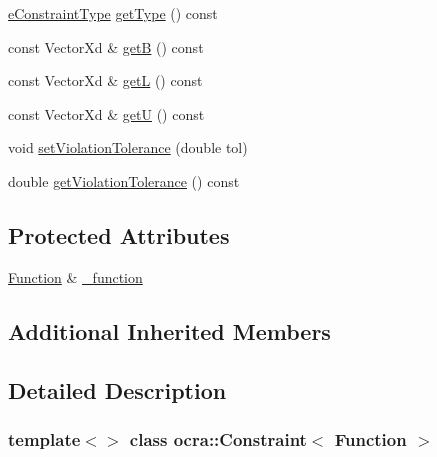 {\bf }\par
\begin{DoxyCompactItemize}
\item 
\hyperlink{namespaceocra_aedff92662043a7f15dc263363db7939b}{e\+Constraint\+Type} \hyperlink{classocra_1_1Constraint_3_01Function_01_4_a05ee69ff17396c36c12dc6df6c7cc12e}{get\+Type} () const
\item 
const Vector\+Xd \& \hyperlink{classocra_1_1Constraint_3_01Function_01_4_a18ee02ca835269c8b648519be8a663ce}{getB} () const
\item 
const Vector\+Xd \& \hyperlink{classocra_1_1Constraint_3_01Function_01_4_a9539f6914fb118de1352f7558c3cb203}{getL} () const
\item 
const Vector\+Xd \& \hyperlink{classocra_1_1Constraint_3_01Function_01_4_aec8febaea23e49d7166a1aeafbcb3f23}{getU} () const
\end{DoxyCompactItemize}

{\bf }\par
\begin{DoxyCompactItemize}
\item 
void \hyperlink{classocra_1_1Constraint_3_01Function_01_4_ac87f7fc6513adba1044b8f53f3fd2f5d}{set\+Violation\+Tolerance} (double tol)
\item 
double \hyperlink{classocra_1_1Constraint_3_01Function_01_4_a72f3bc312073f4d431547261ff06387e}{get\+Violation\+Tolerance} () const
\end{DoxyCompactItemize}

\subsection*{Protected Attributes}
\begin{DoxyCompactItemize}
\item 
\hyperlink{classocra_1_1Function}{Function} \& \hyperlink{classocra_1_1Constraint_3_01Function_01_4_a51f8ef2f03da02c092aff7db27b325b6}{\+\_\+function}
\end{DoxyCompactItemize}
\subsection*{Additional Inherited Members}


\subsection{Detailed Description}
\subsubsection*{template$<$$>$\newline
class ocra\+::\+Constraint$<$ Function $>$}



